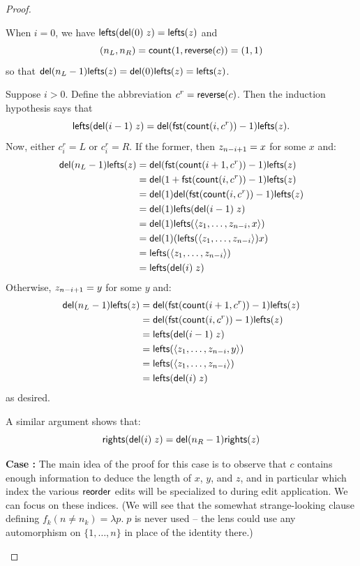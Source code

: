 \begin{proof}
{\begin{trivlist}
    When $i=0$, we have $\mathsf{lefts}(\mathsf{del}(0)\;z)=\mathsf{lefts}(z)$ and
    \[(n_L,n_R) = \mathsf{count}(1,\mathsf{reverse}(c)) = (1,1)\] so that
    $\mathsf{del}(n_L-1)\mathsf{lefts}(z)=\mathsf{del}(0)\mathsf{lefts}(z)=\mathsf{lefts}(z)$.

    Suppose $i>0$. Define the abbreviation $c^r=\mathsf{reverse}(c)$.
    Then the induction hypothesis says that
    \[\mathsf{lefts}(\mathsf{del}(i-1)\;z)=\mathsf{del}(\mathsf{fst}(\mathsf{count}(i,c^r))-1)\mathsf{lefts}(z).\]
    Now, either $c^r_i=L$ or $c^r_i=R$. If the former, then
    $z_{n-i+1}= x$ for some $x$ and:
    \begin{align*}
        \mathsf{del}(n_L-1)\mathsf{lefts}(z)
        &= \mathsf{del}(\mathsf{fst}(\mathsf{count}(i+1,c^r))-1)\mathsf{lefts}(z) \\
        &= \mathsf{del}(1+\mathsf{fst}(\mathsf{count}(i,c^r))-1)\mathsf{lefts}(z) \\
        &= \mathsf{del}(1)\mathsf{del}(\mathsf{fst}(\mathsf{count}(i,c^r))-1)\mathsf{lefts}(z) \\
        &= \mathsf{del}(1)\mathsf{lefts}(\mathsf{del}(i-1)\;z) \\
        &= \mathsf{del}(1)\mathsf{lefts}(\left< z_1 ,\ldots, z_{n-i}, x\right>) \\
        &= \mathsf{del}(1)(\mathsf{lefts}(\left< z_1 ,\ldots, z_{n-i}\right>)x) \\
        &= \mathsf{lefts}(\left< z_1 ,\ldots, z_{n-i}\right>) \\
        &= \mathsf{lefts}(\mathsf{del}(i)\;z)
    \end{align*}
    Otherwise, $z_{n-i+1}= y$ for some $y$ and:
    \begin{align*}
        \mathsf{del}(n_L-1)\mathsf{lefts}(z)
        &= \mathsf{del}(\mathsf{fst}(\mathsf{count}(i+1,c^r))-1)\mathsf{lefts}(z) \\
        &= \mathsf{del}(\mathsf{fst}(\mathsf{count}(i,c^r))-1)\mathsf{lefts}(z) \\
        &= \mathsf{lefts}(\mathsf{del}(i-1)\;z) \\
        &= \mathsf{lefts}(\left< z_1 ,\ldots, z_{n-i}, y\right>) \\
        &= \mathsf{lefts}(\left< z_1 ,\ldots, z_{n-i}\right>) \\
        &= \mathsf{lefts}(\mathsf{del}(i)\;z)
    \end{align*}
    as desired.

    A similar argument shows that:
    \[\mathsf{rights}(\mathsf{del}(i)\;z) = \mathsf{del}(n_R-1)\mathsf{rights}(z)\]

\item {\bf Case :}
    The main idea of the proof for this case is to observe that $c$ contains
    enough information to deduce the length of $x$, $y$, and $z$, and in
    particular which index the various $\mathsf{reorder}$ edits will be
    specialized to during edit application. We can focus on these indices.
    (We will see that the somewhat strange-looking clause defining $f_k(n
    \ne n_k) = \lambda p.\; p$ is never used -- the lens could use any
    automorphism on $\{1,\ldots,n\}$ in place of the identity there.)


\end{trivlist}}
\end{proof}
